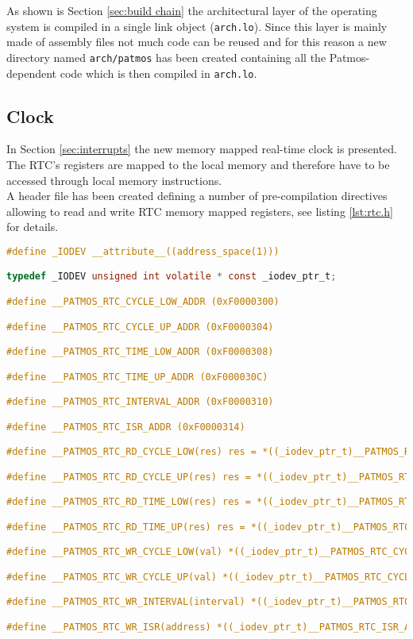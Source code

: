 As shown is Section \ref{sec:build chain} the architectural layer of the operating system is compiled in a single link object (\texttt{arch.lo}). Since this layer is mainly made of assembly files not much code can be reused and for this reason a new directory named \texttt{arch/patmos} has been created containing all the Patmos-dependent code which is then compiled in \texttt{arch.lo}.

\subsection{Clock} 

In Section \ref{sec:interrupts} the new memory mapped real-time clock is presented. The RTC's registers are mapped to the local memory and therefore have to be accessed through local memory instructions.\\
A header file has been created defining a number of pre-compilation directives allowing to read and write RTC memory mapped registers, see listing \ref{lst:rtc.h} for details.

\begin{lstlisting}[language=C, caption=rtc.h contains directives to read and write memory mapped RTC registers, label=lst:rtc.h]
#define _IODEV __attribute__((address_space(1)))

typedef _IODEV unsigned int volatile * const _iodev_ptr_t;

#define __PATMOS_RTC_CYCLE_LOW_ADDR (0xF0000300)

#define __PATMOS_RTC_CYCLE_UP_ADDR (0xF0000304)

#define __PATMOS_RTC_TIME_LOW_ADDR (0xF0000308)

#define __PATMOS_RTC_TIME_UP_ADDR (0xF000030C)

#define __PATMOS_RTC_INTERVAL_ADDR (0xF0000310)

#define __PATMOS_RTC_ISR_ADDR (0xF0000314)

#define __PATMOS_RTC_RD_CYCLE_LOW(res) res = *((_iodev_ptr_t)__PATMOS_RTC_CYCLE_LOW_ADDR);

#define __PATMOS_RTC_RD_CYCLE_UP(res) res = *((_iodev_ptr_t)__PATMOS_RTC_CYCLE_UP_ADDR);

#define __PATMOS_RTC_RD_TIME_LOW(res) res = *((_iodev_ptr_t)__PATMOS_RTC_TIME_LOW_ADDR);

#define __PATMOS_RTC_RD_TIME_UP(res) res = *((_iodev_ptr_t)__PATMOS_RTC_TIME_UP_ADDR);

#define __PATMOS_RTC_WR_CYCLE_LOW(val) *((_iodev_ptr_t)__PATMOS_RTC_CYCLE_LOW_ADDR) = val;

#define __PATMOS_RTC_WR_CYCLE_UP(val) *((_iodev_ptr_t)__PATMOS_RTC_CYCLE_UP_ADDR) = val;

#define __PATMOS_RTC_WR_INTERVAL(interval) *((_iodev_ptr_t)__PATMOS_RTC_INTERVAL_ADDR) = interval;

#define __PATMOS_RTC_WR_ISR(address) *((_iodev_ptr_t)__PATMOS_RTC_ISR_ADDR) = address;
\end{lstlisting}

